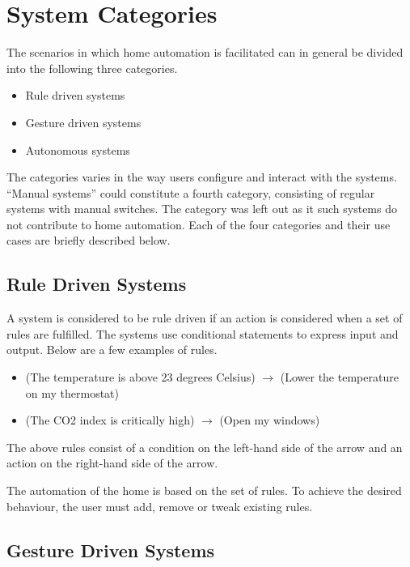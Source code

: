 \section{System Categories}\label{sec:system-categories}

The scenarios in which home automation is facilitated can in general be divided into the following three categories.

\begin{itemize}
\item Rule driven systems
\item Gesture driven systems
\item Autonomous systems
\end{itemize}

The categories varies in the way users configure and interact with the systems. ``Manual systems'' could constitute a fourth category, consisting of regular systems with manual switches. The category was left out as it such systems do not contribute to home automation.
Each of the four categories and their use cases are briefly described below.

\subsection{Rule Driven Systems}

A system is considered to be rule driven if an action is considered when a set of rules are  fulfilled. The systems use conditional statements to express input and output. Below are a few examples of rules.

\begin{itemize}
\item (The temperature is above 23 degrees Celsius) $\rightarrow$ (Lower the temperature on my thermostat)
\item (The CO2 index is critically high) $\rightarrow$ (Open my windows)
\end{itemize}

The above rules consist of a condition on the left-hand side of the arrow and an action on the right-hand side of the arrow.

The automation of the home is based on the set of rules. To achieve the desired behaviour, the user must add, remove or tweak existing rules.

\subsection{Gesture Driven Systems}

